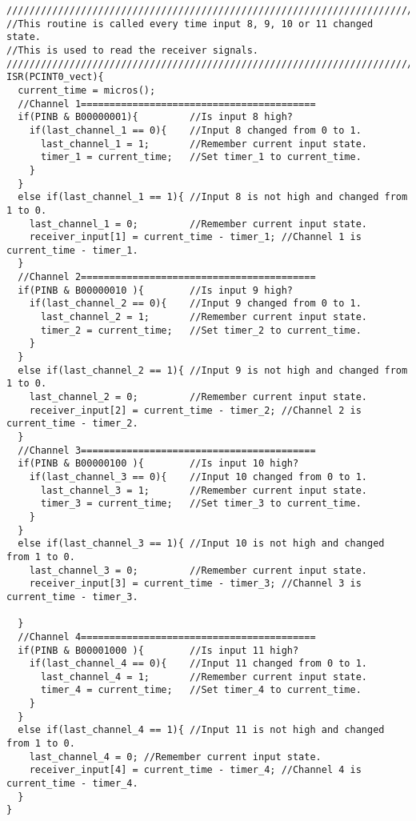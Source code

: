 \begin{lstlisting}
////////////////////////////////////////////////////////////////////////////////////////  
//This routine is called every time input 8, 9, 10 or 11 changed state. 
//This is used to read the receiver signals. 
////////////////////////////////////////////////////////////////////////////////////////  
ISR(PCINT0_vect){
  current_time = micros();
  //Channel 1=========================================
  if(PINB & B00000001){         //Is input 8 high?
    if(last_channel_1 == 0){    //Input 8 changed from 0 to 1.
      last_channel_1 = 1;       //Remember current input state.
      timer_1 = current_time;   //Set timer_1 to current_time.
    }
  }
  else if(last_channel_1 == 1){ //Input 8 is not high and changed from 1 to 0.
    last_channel_1 = 0;         //Remember current input state.
    receiver_input[1] = current_time - timer_1; //Channel 1 is current_time - timer_1.
  }
  //Channel 2=========================================
  if(PINB & B00000010 ){        //Is input 9 high?
    if(last_channel_2 == 0){    //Input 9 changed from 0 to 1.
      last_channel_2 = 1;       //Remember current input state.
      timer_2 = current_time;   //Set timer_2 to current_time.
    }
  }
  else if(last_channel_2 == 1){ //Input 9 is not high and changed from 1 to 0.
    last_channel_2 = 0;         //Remember current input state.
    receiver_input[2] = current_time - timer_2; //Channel 2 is current_time - timer_2.
  }
  //Channel 3=========================================
  if(PINB & B00000100 ){        //Is input 10 high?
    if(last_channel_3 == 0){    //Input 10 changed from 0 to 1.
      last_channel_3 = 1;       //Remember current input state.
      timer_3 = current_time;   //Set timer_3 to current_time.
    }
  }
  else if(last_channel_3 == 1){ //Input 10 is not high and changed from 1 to 0.
    last_channel_3 = 0;         //Remember current input state.
    receiver_input[3] = current_time - timer_3; //Channel 3 is current_time - timer_3.

  }
  //Channel 4=========================================
  if(PINB & B00001000 ){        //Is input 11 high?
    if(last_channel_4 == 0){    //Input 11 changed from 0 to 1.
      last_channel_4 = 1;       //Remember current input state.
      timer_4 = current_time;   //Set timer_4 to current_time.
    }
  }
  else if(last_channel_4 == 1){ //Input 11 is not high and changed from 1 to 0.
    last_channel_4 = 0; //Remember current input state.
    receiver_input[4] = current_time - timer_4; //Channel 4 is current_time - timer_4.
  }
}


\end{lstlisting}
